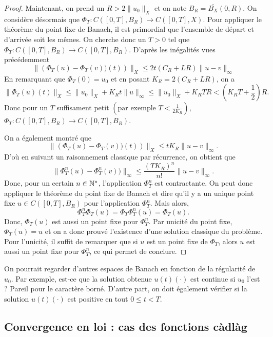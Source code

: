\begin{proof}
	Maintenant, on prend un $R > 2\|u_0\|_X$ et on note $B_R  = \overline{B_X}(0,R)$.
	On considère désormais que $\Phi_T : C([0,T], B_R) \to C([0,T], X)$. Pour appliquer le théorème du point fixe de Banach, il est primordial que l'ensemble de départ et d'arrivée soit les mêmes. On cherche donc un $T > 0$ tel que $\Phi_T : C([0,T], B_R) \to C([0,T], B_R)$. D'après les inégalités vues précédemment
	\[
		\|\left(\Phi_T(u) - \Phi_T(v))(t)\right)\|_X \le
		2 t \left( C_{R} + L R \right)\|u-v\|_\infty
	\]
	En remarquant que $\Phi_T(0) = u_0$ et en posant $K_R = 2 \left( C_{R} + L R \right)$,
	on a
	\[
		\|\Phi_T(u)(t)\|_X \le \|u_0\|_X + K_R t \|u\|_\infty \le \|u_0\|_X + K_R T R
		< \left(K_R T + \frac{1}{2}\right) R.
	\]
	Donc pour un $T$ suffisament petit $\left(\text{par exemple } T < \frac{1}{2 K_R}\right)$, $\Phi_T : C([0,T], B_R) \to C([0,T], B_R)$.

	On a également montré que
	\[
		\|\left(\Phi_T(u) - \Phi_T(v))(t)\right)\|_X \le
		t K_R\|u-v\|_\infty.
	\]
	D'où en suivant un raisonnement classique par récurrence, on obtient que
	\[
		\|\Phi_T^n(u) - \Phi_T^n(v))\|_\infty \le
		\frac{\left(T K_R\right)^n}{n !}\|u-v\|_\infty.
	\]
	Donc, pour un certain $n \in \mathbb{N}^*$, l'application $\Phi_T^n$ est contractante. On peut donc appliquer le théorème du point fixe de Banach et dire qu'il y a un unique point fixe $u \in C([0,T], B_R)$ pour l'application $\Phi_T^n$. Mais alors,
	\[
		\Phi_T^{n}\Phi_T(u) = \Phi_T \Phi_T^n(u) = \Phi_T(u).
	\]
	Donc, $\Phi_T(u)$ est aussi un point fixe pour $\Phi_T^n$. Par unicité du point fixe, $\Phi_T(u) = u$ et on a donc prouvé l'existence d'une solution classique du problème. Pour l'unicité, il suffit de remarquer que si $u$ est un point fixe de $\Phi_T$, alors $u$ est aussi un point fixe pour $\Phi_T^n$, ce qui permet de conclure.
\end{proof}

\begin{rem}
	On pourrait regarder d'autres espaces de Banach en fonction de la régularité de $u_0$. Par exemple, est-ce que la solution obtenue $u(t)(\cdot)$ est continue si $u_0$ l'est ? Pareil pour le caractère borné. D'autre part, on doit également vérifier si la solution $u(t)(\cdot)$ est positive en tout $0 \le t < T$.
\end{rem}

\subsection{Convergence en loi : cas des fonctions càdlàg}

